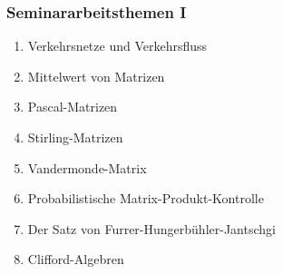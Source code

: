 %
%
%
\begin{frame}
\frametitle{Seminararbeitsthemen I}
\begin{enumerate}[<+->]
\item
Verkehrsnetze und Verkehrsfluss
\item
Mittelwert von Matrizen
\item
Pascal-Matrizen
\item 
Stirling-Matrizen
\item
Vandermonde-Matrix
\item
Probabilistische Matrix-Produkt-Kontrolle
\item
Der Satz von Furrer-Hungerbühler-Jantschgi
\item
Clifford-Algebren
\end{enumerate}
\end{frame}

